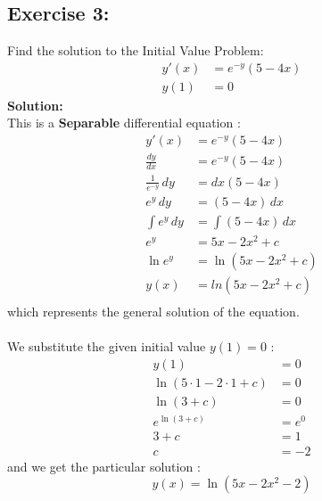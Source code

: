 \documentclass{article}
\begin{document}
\subsection{Exercise 3:}
Find the solution to the Initial Value Problem:
\begin{align*}
    y'(x) &= e^{-y}(5-4x) \\
    y(1) &= 0
\end{align*}
 \textbf{Solution:} \\
 This is a \textbf{Separable} differential equation :
\begin{align*}
     y'(x) &= e^{-y}(5-4x) \\
     \frac{dy}{dx} &= e^{-y}(5-4x) \\
     \frac{1}{e^{-y}}\,dy &= dx(5-4x) \\
     e^y\,dy &= (5-4x)\,dx \\
     \int{e^y}\,dy &= \int(5-4x)\,dx \\
     e^y &= 5x-2x^2+c \\
     \ln{e^y} &= \ln{(5x-2x^2+c)} \\
     y(x) &= ln{(5x-2x^2+c)} \\
\end{align*}
which represents the general solution of the equation. \\ \\
We substitute the given initial value $y(1) = 0$ :
\begin{align*}
    y(1) &= 0 \\
    \ln(5\cdot1-2\cdot1+c) &= 0 \\
    \ln{(3+c)} &= 0 \\
    e^{\ln{(3+c)}} &= e^0 \\
    3+c &= 1 \\
    c &= -2
\end{align*}
and we get the particular solution :
$$y(x) = \ln{(5x-2x^2-2)}$$

\newpage
\end{document}
